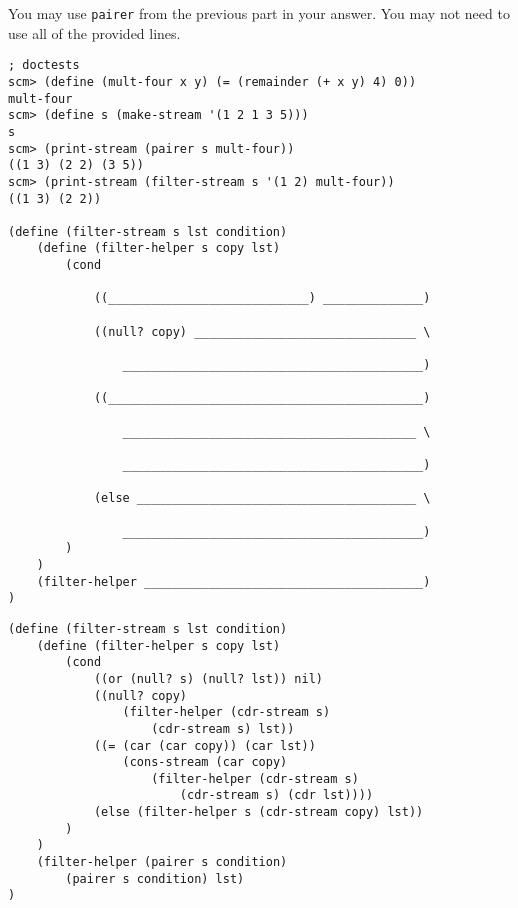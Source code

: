\begin{parts}
You may use \lstinline{pairer} from the previous part in your answer. You may not need to use all of the provided lines.

\begin{lstlisting}
; doctests
scm> (define (mult-four x y) (= (remainder (+ x y) 4) 0))
mult-four
scm> (define s (make-stream '(1 2 1 3 5)))
s
scm> (print-stream (pairer s mult-four))
((1 3) (2 2) (3 5))
scm> (print-stream (filter-stream s '(1 2) mult-four))
((1 3) (2 2))

(define (filter-stream s lst condition)
    (define (filter-helper s copy lst)
        (cond

            ((____________________________) ______________)

            ((null? copy) _______________________________ \

                __________________________________________)

            ((____________________________________________)

                _________________________________________ \

                __________________________________________)

            (else _______________________________________ \

                __________________________________________)
        )
    )
    (filter-helper _______________________________________)
)
\end{lstlisting}

\begin{solution}
\begin{lstlisting}
(define (filter-stream s lst condition)
    (define (filter-helper s copy lst)
        (cond
            ((or (null? s) (null? lst)) nil)
            ((null? copy) 
                (filter-helper (cdr-stream s) 
                    (cdr-stream s) lst))
            ((= (car (car copy)) (car lst)) 
                (cons-stream (car copy) 
                    (filter-helper (cdr-stream s) 
                        (cdr-stream s) (cdr lst))))
            (else (filter-helper s (cdr-stream copy) lst))
        )
    )
    (filter-helper (pairer s condition) 
        (pairer s condition) lst)
)
\end{lstlisting}
\end{solution}

\end{parts}